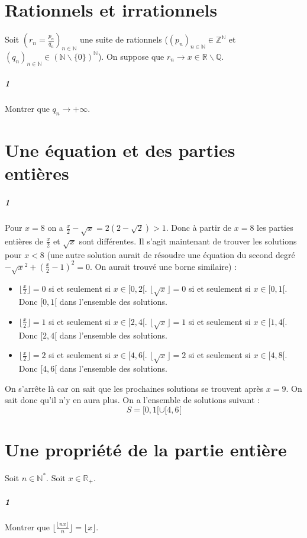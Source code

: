 \documentclass[10pt,a4paper]{article}
\begin{document}
\section{Rationnels et irrationnels}
Soit $\left( r_n=\frac{p_n}{q_n} \right)_{n \in \mathbb{N}}$ une suite de rationnels ($(p_n)_{n\in \mathbb{N}} \in \mathbb{Z}^{\mathbb{N}}$ et $(q_n)_{n \in \mathbb{N}} \in \left(\mathbb{N} \backslash \lbrace 0 \rbrace \right) ^{\mathbb{N}}$). On suppose que $r_n \rightarrow x \in \mathbb{R} \backslash \mathbb{Q}$.
\subparagraph{1} Montrer que $q_n \rightarrow +\infty$.

\section{Une équation et des parties entières}
\subparagraph{1}Pour $x=8$ on a $\frac{x}{2}-\sqrt{x}=2(2-\sqrt{2})>1$. Donc à partir de $x=8$ les parties entières de $\frac{x}{2}$ et $\sqrt{x}$ sont différentes. Il s'agit maintenant de trouver les solutions pour $x<8$ (une autre solution aurait de résoudre une équation du second degré $-\sqrt{x}^2+(\frac{x}{2}-1)^2=0$. On aurait trouvé une borne similaire) :
\begin{itemize}
\item $\lfloor \frac{x}{2} \rfloor =0$ si et seulement si $x \in [0,2[$. $\lfloor \sqrt{x} \rfloor=0$ si et seulement si $x \in [0,1[$. Donc $[0,1[$ dans l'ensemble des solutions.
\item $\lfloor \frac{x}{2} \rfloor =1$ si et seulement si $x \in [2,4[$. $\lfloor \sqrt{x} \rfloor=1$ si et seulement si $x \in [1,4[$. Donc $[2,4[$  dans l'ensemble des solutions.
\item $\lfloor \frac{x}{2} \rfloor =2$ si et seulement si $x \in [4,6[$. $\lfloor \sqrt{x} \rfloor=2$ si et seulement si $x \in [4,8[$. Donc $[4,6[$  dans l'ensemble des solutions.
\end{itemize}
On s'arrête là car on sait que les prochaines solutions se trouvent après $x=9$. On sait donc qu'il n'y en aura plus. On a l'ensemble de solutions suivant :
\begin{equation}
S=[0,1[ \cup [4,6[
\end{equation}
\section{Une propriété de la partie entière}
Soit $n \in \mathbb{N}^*$. Soit $x \in \mathbb{R}_+$.
\subparagraph{1}Montrer que $\lfloor \frac{\lfloor  nx \rfloor}{n} \rfloor =\lfloor x \rfloor$.
\end{document}
